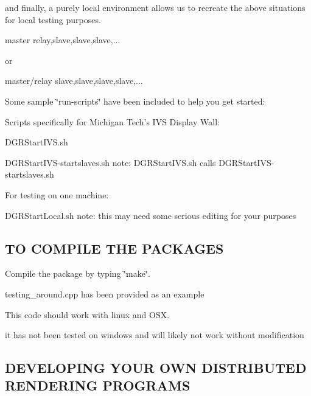 and finally, a purely local environment allows us to recreate the above situations for local testing purposes. \begin{DoxyVerb}                                                master
                                      {relay,slave,slave,slave,...}

                                                  or

                                             master/relay
                                      {slave,slave,slave,slave,...}
\end{DoxyVerb}


Some sample \char`\"{}run-\/scripts\char`\"{} have been included to help you get started\+:

Scripts specifically for Michigan Tech's I\+V\+S Display Wall\+:


\begin{DoxyItemize}
\item D\+G\+R\+Start\+I\+V\+S.\+sh
\item D\+G\+R\+Start\+I\+V\+S-\/startslaves.\+sh note\+: D\+G\+R\+Start\+I\+V\+S.\+sh calls D\+G\+R\+Start\+I\+V\+S-\/startslaves.\+sh
\end{DoxyItemize}

For testing on one machine\+:


\begin{DoxyItemize}
\item D\+G\+R\+Start\+Local.\+sh note\+: this may need some serious editing for your purposes
\end{DoxyItemize}

\subsection*{T\+O C\+O\+M\+P\+I\+L\+E T\+H\+E P\+A\+C\+K\+A\+G\+E\+S }


\begin{DoxyItemize}
\item Compile the package by typing \char`\"{}make\char`\"{}.
\item testing\+\_\+around.\+cpp has been provided as an example
\item This code should work with linux and O\+S\+X.
\item it has not been tested on windows and will likely not work without modification
\end{DoxyItemize}

\subsection*{D\+E\+V\+E\+L\+O\+P\+I\+N\+G Y\+O\+U\+R O\+W\+N D\+I\+S\+T\+R\+I\+B\+U\+T\+E\+D R\+E\+N\+D\+E\+R\+I\+N\+G P\+R\+O\+G\+R\+A\+M\+S }


